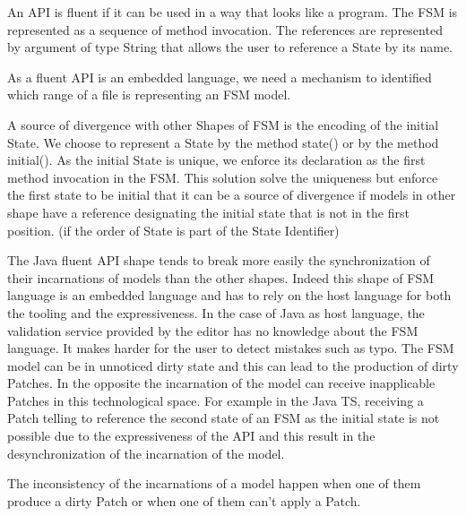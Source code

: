 \documentclass[sigplan]{acmart}
\begin{document}
An API is fluent if it can be used in a way that looks like a program.
The FSM is represented as a sequence of method invocation.
The references are represented by argument of type String that allows the user to reference a State by its name.

As a fluent API is an embedded language, we need a mechanism to identified which range of a file is representing an FSM model.

A source of divergence with other Shapes of FSM is the encoding of the initial State.
We choose to represent a State by the method state() or by the method initial().
As the initial State is unique, we enforce its declaration as the first method invocation in the FSM. This solution solve the uniqueness but enforce the first state to be initial that it can be a source of divergence if models in other shape have a reference designating the initial state that is not in the first position. (if the order of State is part of the State Identifier)

The Java fluent API shape tends to break more easily the synchronization of their incarnations of models than the other shapes.
Indeed this shape of FSM language is an embedded language and has to rely on the host language for both the tooling and the expressiveness.
In the case of Java as host language, the validation service provided by the editor has no knowledge about the FSM language.
It makes harder for the user to detect mistakes such as typo. The FSM model can be in unnoticed dirty state and this can lead to the production of dirty Patches.
In the opposite the incarnation of the model can receive inapplicable Patches in this technological space.
For example in the Java TS, receiving a Patch telling to reference the second state of an FSM as the initial state is not possible due to the expressiveness of the API and this result in the desynchronization of the incarnation of the model.

The inconsistency of the incarnations of a model happen when one of them produce a dirty Patch or when one of them can't apply a Patch.
\end{document}
